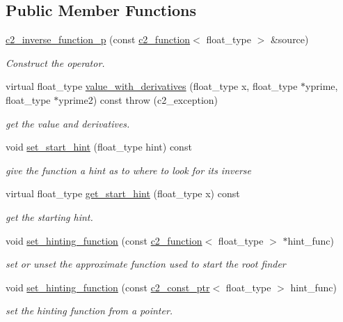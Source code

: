 \subsection*{Public Member Functions}
\begin{DoxyCompactItemize}
\item 
\hyperlink{classc2__inverse__function__p_a764ddeb41fcf06a36c3435be12bf7611}{c2\-\_\-inverse\-\_\-function\-\_\-p} (const \hyperlink{classc2__function}{c2\-\_\-function}$<$ float\-\_\-type $>$ \&source)
\begin{DoxyCompactList}\small\item\em Construct the operator. \end{DoxyCompactList}\item 
virtual float\-\_\-type \hyperlink{classc2__inverse__function__p_a907dbfc4a1ea0530ae76a1ae8704f8ce}{value\-\_\-with\-\_\-derivatives} (float\-\_\-type x, float\-\_\-type $\ast$yprime, float\-\_\-type $\ast$yprime2) const   throw (c2\-\_\-exception)
\begin{DoxyCompactList}\small\item\em get the value and derivatives. \end{DoxyCompactList}\item 
void \hyperlink{classc2__inverse__function__p_a71c6d3be4ae949024979f0968c5bf1f4}{set\-\_\-start\-\_\-hint} (float\-\_\-type hint) const 
\begin{DoxyCompactList}\small\item\em give the function a hint as to where to look for its inverse \end{DoxyCompactList}\item 
virtual float\-\_\-type \hyperlink{classc2__inverse__function__p_a49eac4019f5e0213c9d2111a1007b699}{get\-\_\-start\-\_\-hint} (float\-\_\-type x) const 
\begin{DoxyCompactList}\small\item\em get the starting hint. \end{DoxyCompactList}\item 
void \hyperlink{classc2__inverse__function__p_a69e1d30e9266238303183b25cdcf19ce}{set\-\_\-hinting\-\_\-function} (const \hyperlink{classc2__function}{c2\-\_\-function}$<$ float\-\_\-type $>$ $\ast$hint\-\_\-func)
\begin{DoxyCompactList}\small\item\em set or unset the approximate function used to start the root finder \end{DoxyCompactList}\item 
void \hyperlink{classc2__inverse__function__p_aa8e91ae51b9d0a0f7085f6bd512574fa}{set\-\_\-hinting\-\_\-function} (const \hyperlink{classc2__const__ptr}{c2\-\_\-const\-\_\-ptr}$<$ float\-\_\-type $>$ hint\-\_\-func)
\begin{DoxyCompactList}\small\item\em set the hinting function from a pointer. \end{DoxyCompactList}\end{DoxyCompactItemize}
